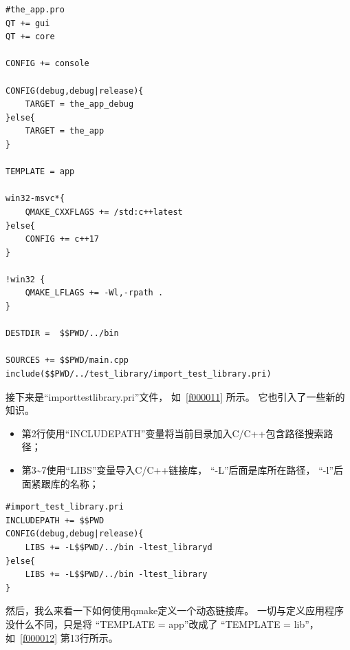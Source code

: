 \begin{lstlisting}[label=f000016,
caption=GoodLuck,
title=\lstlistingname\ \thelstlisting
]
#the_app.pro
QT += gui
QT += core

CONFIG += console

CONFIG(debug,debug|release){
    TARGET = the_app_debug
}else{
    TARGET = the_app
}

TEMPLATE = app

win32-msvc*{
    QMAKE_CXXFLAGS += /std:c++latest
}else{
    CONFIG += c++17
}

!win32 {
    QMAKE_LFLAGS += -Wl,-rpath .
}

DESTDIR =  $$PWD/../bin

SOURCES += $$PWD/main.cpp
include($$PWD/../test_library/import_test_library.pri)
\end{lstlisting}          %


接下来是“import\underline{\hspace{0.5em}}test\underline{\hspace{0.5em}}library.pri”文件，
如\lstlistingname\ \ref{f000011} 所示。
它也引入了一些新的知识。
\begin{itemize}
\item 第2行使用“INCLUDEPATH”变量将当前目录加入C/C++包含路径搜索路径；
\item 第3\~{}7使用“LIBS”变量导入C/C++链接库，
“-L”后面是库所在路径，
“-l”后面紧跟库的名称；
\end{itemize}
\begin{lstlisting}[label=f000011,
caption=GoodLuck,
title=\lstlistingname\ \thelstlisting
]
#import_test_library.pri
INCLUDEPATH += $$PWD
CONFIG(debug,debug|release){
    LIBS += -L$$PWD/../bin -ltest_libraryd
}else{
    LIBS += -L$$PWD/../bin -ltest_library
}
\end{lstlisting}          %


然后，我么来看一下如何使用qmake定义一个动态链接库。
一切与定义应用程序没什么不同，只是将
“TEMPLATE = app”改成了
“TEMPLATE = lib”，如\lstlistingname\ \ref{f000012} 第13行所示。

